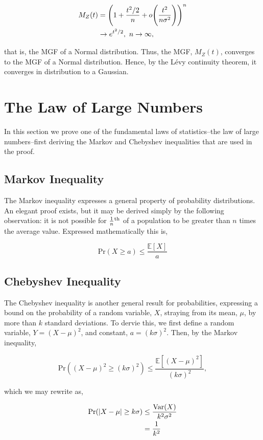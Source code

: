 \documentclass[11pt]{amsart}
\begin{document}
\begin{align}
M_Z(t) &= \Bigg(1 + \frac{t^2/2}{n} + o\Bigg(\frac{t^2}{n\sigma^2}\Bigg)\Bigg)^n \notag \\
&\to e^{t^2/2}, \ n \to \infty, \notag
\end{align}

that is, the MGF of a Normal distribution. Thus, the MGF, $M_Z(t)$, converges to the MGF of a Normal distribution. Hence, by the L\'evy continuity theorem, it converges in distribution to a Gaussian.

\section{The Law of Large Numbers}

In this section we prove one of the fundamental laws of statistics--the law of large numbers--first deriving the Markov and Chebyshev inequalities that are used in the proof.

\subsection{Markov Inequality}

The Markov inequality expresses a general property of probability distributions. An elegant proof exists, but it may be derived simply by the following observation: it is not possible for $\frac{1}{n}\textsuperscript{th}$ of a population to be greater than $n$ times the average value. Expressed mathematically this is,

$$\text{Pr}(X \geq a) \leq \frac{\mathbb{E}[X]}{a}$$

\subsection{Chebyshev Inequality}

The Chebyshev inequality is another general result for probabilities, expressing a bound on the probability of a random variable, $X$, straying from its mean, $\mu$, by more than $k$ standard deviations. To dervie this, we first define a random variable, $Y = (X - \mu)^2$, and constant, $a = (k\sigma)^2$. Then, by the Markov inequality,

$$\text{Pr}((X - \mu)^2 \geq (k\sigma)^2) \leq \frac{\mathbb{E}[(X - \mu)^2]}{(k\sigma)^2},$$

which we may rewrite as,

\begin{align}
\text{Pr}(|X - \mu| \geq k\sigma) &\leq \frac{\text{Var}(X)}{k^2\sigma^2} \notag \\
&= \frac{1}{k^2} \notag
\end{align}
\end{document}
